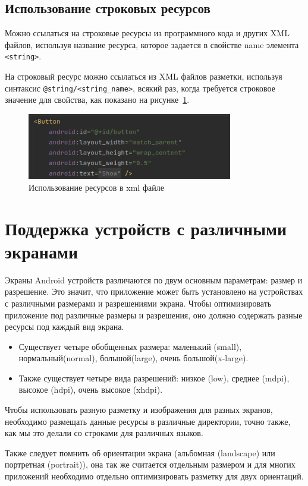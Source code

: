 \subsection{Использование строковых ресурсов}
Можно ссылаться на строковые ресурсы из программного кода и других
XML файлов, используя название ресурса, которое задается в свойстве name
элемента \texttt{<string>}.\par
На строковый ресурс можно ссылаться из XML файлов разметки,
используя синтаксис \texttt{@string/<string\_name>}, всякий раз,
когда требуется строковое значение для свойства, как показано
на рисунке~\ref{fig:xml:string}.
\begin{figure}[h!tp]
	\centering
	\includegraphics[width=0.8\textwidth]{Screenshot from 2023-02-20 18-33-17.png}
	\caption{Использование ресурсов в xml файле}
	\label{fig:xml:string}
\end{figure}

\section{Поддержка устройств с различными экранами}
Экраны Android устройств различаются по двум основным параметрам:
размер и разрешение. Это значит, что приложение
может быть установлено на устройствах с различными размерами и
разрешениями экрана. Чтобы оптимизировать приложение под различные
размеры и разрешения, оно должно содержать разные ресурсы под каждый
вид экрана.

\begin{itemize}
	\item Существует четыре обобщенных размера: маленький (small),
		нормальный(normal), большой(large), очень большой(x-large).
	\item Также существует четыре вида разрешений: низкое (low), среднее
		(mdpi), высокое (hdpi), очень высокое (xhdpi).
\end{itemize}

Чтобы использовать разную разметку и изображения для разных экранов,
необходимо размещать данные ресурсы в различные директории, точно
также, как мы это делали со строками для различных языков.\par
Также следует помнить об ориентации экрана (альбомная (landscape) или
портретная (portrait)), она так же считается отдельным размером и для
многих приложений необходимо отдельно оптимизировать разметку для
двух ориентаций.

